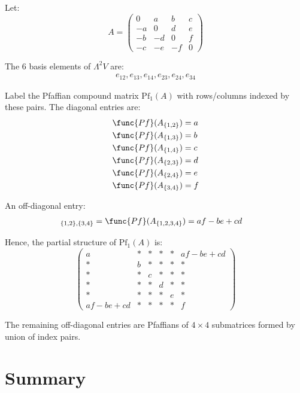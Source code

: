 \documentclass[aps,prd,onecolumn,notitlepage,nofootinbib]{revtex4-2}
\begin{document}
Let: 
\begin{equation}
A = 
\begin{pmatrix}
0 & a & b & c \\ 
-a & 0 & d & e \\ 
-b & -d & 0 & f \\ 
-c & -e & -f & 0%
\end{pmatrix}%
\end{equation}

The 6 basis elements of $\Lambda^2 V$ are: 
\begin{align*}
e_{12}, e_{13}, e_{14}, e_{23}, e_{24}, e_{34}
\end{align*}

Label the Pfaffian compound matrix $\mathrm{Pf}_1(A)$ with rows/columns
indexed by these pairs. The diagonal entries are: 
\begin{align*}
\func{Pf}(A_{\{1,2\}}) &= a \\
\func{Pf}(A_{\{1,3\}}) &= b \\
\func{Pf}(A_{\{1,4\}}) &= c \\
\func{Pf}(A_{\{2,3\}}) &= d \\
\func{Pf}(A_{\{2,4\}}) &= e \\
\func{Pf}(A_{\{3,4\}}) &= f
\end{align*}

An off-diagonal entry: 
\begin{align*}
[\mathrm{Pf}_1(A)]_{\{1,2\},\{3,4\}} &= \func{Pf}(A_{\{1,2,3,4\}}) = af - be
+ cd
\end{align*}

Hence, the partial structure of $\mathrm{Pf}_1(A)$ is: 
\begin{equation}
\begin{pmatrix}
a & * & * & * & * & af - be + cd \\* 
& b & * & * & * & * \\* 
& * & c & * & * & * \\* 
& * & * & d & * & * \\* 
& * & * & * & e & * \\ 
af - be + cd & * & * & * & * & f%
\end{pmatrix}%
\end{equation}

The remaining off-diagonal entries are Pfaffians of $4 \times 4$ submatrices
formed by union of index pairs.

\section*{Summary}
\end{document}
